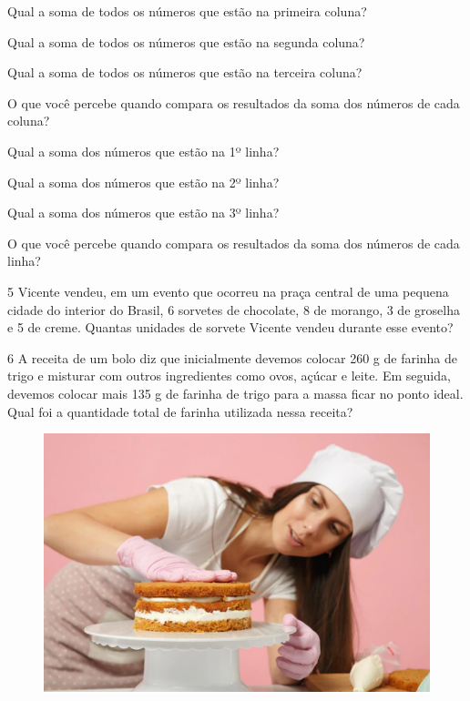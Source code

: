 \begin{escolha}
\item Qual a soma de todos os números que estão na primeira coluna?

\item Qual a soma de todos os números que estão na segunda coluna?

\item Qual a soma de todos os números que estão na terceira coluna?

\item O que você percebe quando compara os resultados da soma dos números de cada coluna?

\item Qual a soma dos números que estão na 1º linha?

\item Qual a soma dos números que estão na 2º linha?

\item Qual a soma dos números que estão na 3º linha?

\item O que você percebe quando compara os resultados da soma dos números de cada linha?
\end{escolha}

\num{5} Vicente vendeu, em um evento que ocorreu na praça central de uma pequena
cidade do interior do Brasil, 6 sorvetes de chocolate, 8 de morango, 3
de groselha e 5 de creme. Quantas unidades de sorvete Vicente vendeu durante esse evento?

\num{6} A receita de um bolo diz que inicialmente devemos colocar 260 g de
farinha de trigo e misturar com outros ingredientes como ovos, açúcar e
leite. Em seguida, devemos colocar mais 135 g de farinha de trigo para a
massa ficar no ponto ideal. Qual foi a quantidade total de farinha
utilizada nessa receita?

\begin{figure}[htpb!]
\centering
\includegraphics[width=.5\textwidth]{./media/image15.png}
\end{figure}

